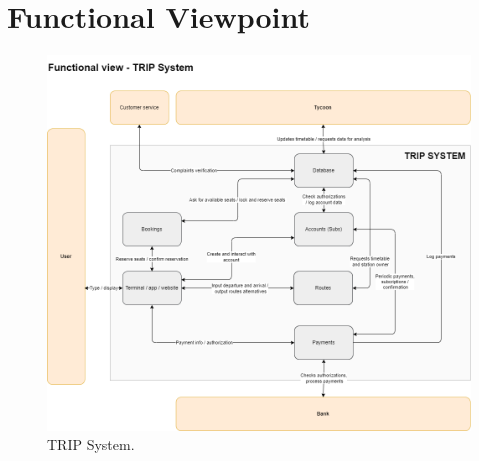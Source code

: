 \section{Functional Viewpoint}
\begin{figure}[H]
    \centering
    \includegraphics[width=\textwidth]{drawings/views_draft2/functional_view_trip_system.png}
    \caption{TRIP System.}
    \label{fig:trip_system}
\end{figure}

